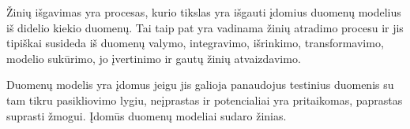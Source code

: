 Žinių išgavimas yra procesas, kurio tikslas yra išgauti įdomius duomenų modelius iš didelio kiekio duomenų.
Tai taip pat yra vadinama žinių atradimo procesu ir jis tipiškai susideda iš duomenų valymo, integravimo, išrinkimo, transformavimo, modelio sukūrimo, jo įvertinimo ir gautų žinių atvaizdavimo.

Duomenų modelis yra įdomus jeigu jis galioja panaudojus testinius duomenis su tam tikru pasikliovimo lygiu, neįprastas ir potencialiai yra pritaikomas, paprastas suprasti žmogui.
Įdomūs duomenų modeliai sudaro žinias. 
